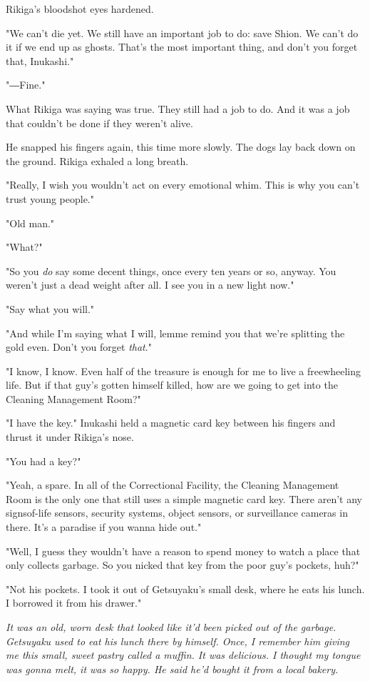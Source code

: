 Rikiga's bloodshot eyes hardened.

"We can't die yet. We still have an important job to do: save Shion. We
can't do it if we end up as ghosts. That's the most important thing, and
don't you forget that, Inukashi."

"―Fine."

What Rikiga was saying was true. They still had a job to do. And it was
a job that couldn't be done if they weren't alive.

He snapped his fingers again, this time more slowly. The dogs lay back
down on the ground. Rikiga exhaled a long breath.

"Really, I wish you wouldn't act on every emotional whim. This is why
you can't trust young people."

"Old man."

"What?"

"So you \emph{do} say some decent things, once every ten years or so, anyway.
You weren't just a dead weight after all. I see you in a new light now."

"Say what you will."

"And while I'm saying what I will, lemme remind you that we're splitting
the gold even. Don't you forget \emph{that}."

"I know, I know. Even half of the treasure is enough for me to live a
freewheeling life. But if that guy's gotten himself killed, how are we
going to get into the Cleaning Management Room?"

"I have the key." Inukashi held a magnetic card key between his fingers
and thrust it under Rikiga's nose.

"You had a key?"

"Yeah, a spare. In all of the Correctional Facility, the Cleaning
Management Room is the only one that still uses a simple magnetic card
key. There aren't any signsof-life sensors, security systems, object
sensors, or surveillance cameras in there. It's a paradise if you wanna
hide out."

"Well, I guess they wouldn't have a reason to spend money to watch a
place that only collects garbage. So you nicked that key from the poor
guy's pockets, huh?"

"Not his pockets. I took it out of Getsuyaku's small desk, where he eats
his lunch. I borrowed it from his drawer."

\emph{It was an old, worn desk that looked like it'd been picked out of the
	garbage. Getsuyaku used to eat his lunch there by himself. Once, I
	remember him giving me this small, sweet pastry called a muffin. It was
	delicious. I thought my tongue was gonna melt, it was so happy. He said
	he'd bought it from a local bakery.}

